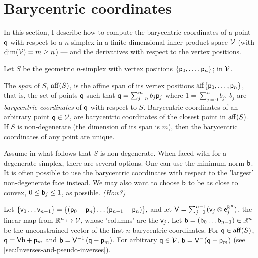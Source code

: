 
\section{Barycentric coordinates}
\label{sec:barycentric-coordinates}

In this section, I describe how to compute
the barycentric coordinates of a point $\mathsf{q}$
with respect to a $n$-simplex in
a finite dimensional inner product space $\mathcal{V}$
(with $\mathrm{dim} (\mathcal{V} ) = m \ge n$) ---
and the derivatives with respect to the vertex positions.

Let $S$ be the geometric $n$-simplex
with vertex positions $\{\mathsf{p}_0 , \ldots , \mathsf{p}_n\}$;
in $\mathcal{V}$.

The {\it span} of $S$, $\affine_span ( S )$,
is the affine span of its vertex positions
$\affine_span \{\p_0 , \ldots , \p_n\}$,
that is, the set of points $\mathsf{q}$ such that
$\mathsf{q} = \sum_{j=n}^{m} b_j \mathsf{p}_j $ where $1 = \sum_{j=0}^{n} b_j $.
$b_j$ are {\it barycentric coordinates} of $\mathsf{q}$ with respect to $S$.
Barycentric coordinates of an arbitrary point $\mathsf{q} \in \mathcal{V}$,
are barycentric coordinates of the closest point in $\affine_span(S)$.
If $S$ is non-degenerate (the dimension of its span is $m$),
then the barycentric coordinates of any point are unique.

Assume in what follows that $S$ is non-degenerate.
When faced with for a degenerate simplex, there are several options.
One can use the minimum norm $\mathsf{b}$.
It is often possible to use the barycentric coordinates
with respect to the 'largest' non-degenerate face instead.
We may also want to choose $\mathsf{b}$ to be as close to convex,
$0 \le \mathsf{b}_j \le 1$, as possible. {\it (How?)}

Let $\{ \mathsf{v}_0 \ldots \mathsf{v}_{n-1} \} = \{ (\mathsf{p}_0 - \mathsf{p}_n) \ldots (\mathsf{p}_{n-1} - \mathsf{p}_n)\},$
and let $\mathsf{V} = \sum_{j=0}^{n-1} ( \mathsf{v}_j \otimes \mathsf{e}_j^{\mathbb{R}^n} )$,
the linear map from $\mathbb{R}^n \mapsto \mathcal{V}$,
whose 'columns' are the $\mathsf{v}_j$.
Let $\mathsf{b} = \left( \mathsf{b}_0 \ldots \mathsf{b}_{n-1} \right) \in \mathbb{R}^n$
be the unconstrained vector of the first $n$ barycentric coordinates.
For $\q \in \affine_span ( S )$, $\mathsf{q} = \mathsf{V} \mathsf{b} + \mathsf{p}_m$
and $\mathsf{b} = \mathsf{V}^{-1} \left ( \mathsf{q} - \mathsf{p}_m \right)$.
For arbitrary $\mathsf{q} \in \mathcal{V}$,
$\mathsf{b} = \mathsf{V}^{-} (\mathsf{q} - \mathsf{p}_m)$
(see \autoref{sec:Inverses-and-pseudo-inverses}).














